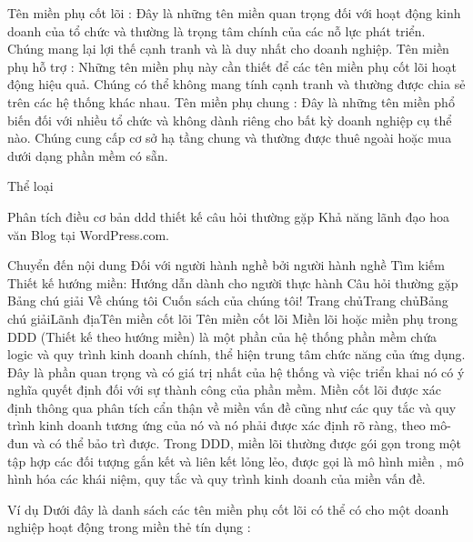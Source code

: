Tên miền phụ cốt lõi : Đây là những tên miền quan trọng đối với hoạt động kinh doanh của tổ chức và thường là trọng tâm chính của các nỗ lực phát triển. Chúng mang lại lợi thế cạnh tranh và là duy nhất cho doanh nghiệp.
Tên miền phụ hỗ trợ : Những tên miền phụ này cần thiết để các tên miền phụ cốt lõi hoạt động hiệu quả. Chúng có thể không mang tính cạnh tranh và thường được chia sẻ trên các hệ thống khác nhau.
Tên miền phụ chung : Đây là những tên miền phổ biến đối với nhiều tổ chức và không dành riêng cho bất kỳ doanh nghiệp cụ thể nào. Chúng cung cấp cơ sở hạ tầng chung và thường được thuê ngoài hoặc mua dưới dạng phần mềm có sẵn.

Thể loại

Phân tích
điều cơ bản
ddd
thiết kế
câu hỏi thường gặp
Khả năng lãnh đạo
hoa văn
Blog tại WordPress.com.






Chuyển đến nội dung
Đối với người hành nghề bởi người hành nghề
Tìm kiếm
Thiết kế hướng miền: Hướng dẫn dành cho người thực hành
Câu hỏi thường gặp
Bảng chú giải
Về chúng tôi
Cuốn sách của chúng tôi!
Trang chủTrang chủBảng chú giảiLãnh địaTên miền cốt lõi
Tên miền cốt lõi
Miền lõi hoặc miền phụ trong DDD (Thiết kế theo hướng miền) là một phần của hệ thống phần mềm chứa logic và quy trình kinh doanh chính, thể hiện trung tâm chức năng của ứng dụng. Đây là phần quan trọng và có giá trị nhất của hệ thống và việc triển khai nó có ý nghĩa quyết định đối với sự thành công của phần mềm. Miền cốt lõi được xác định thông qua phân tích cẩn thận về miền vấn đề cũng như các quy tắc và quy trình kinh doanh tương ứng của nó và nó phải được xác định rõ ràng, theo mô-đun và có thể bảo trì được. Trong DDD, miền lõi thường được gói gọn trong một tập hợp các đối tượng gắn kết và liên kết lỏng lẻo, được gọi là mô hình miền , mô hình hóa các khái niệm, quy tắc và quy trình kinh doanh của miền vấn đề.

Ví dụ
Dưới đây là danh sách các tên miền phụ cốt lõi có thể có cho một doanh nghiệp hoạt động trong miền thẻ tín dụng :

